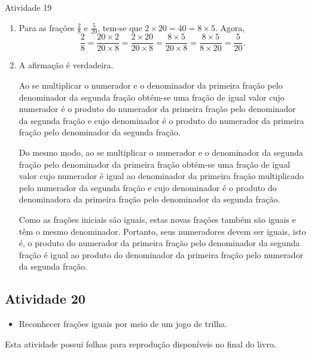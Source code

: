\documentclass[oneside]{book}
\begin{document}
\begin{multicols}{2}
\begin{resposta*}{Atividade 19}  
\begin{enumerate} [\quad a)] %
    \item       Para as frações       $\frac{2}{8}$       e       
$\frac{5}{20}$, tem-se que        $2 \times 20 = 40 = 8 \times 5$. Agora,       
$$\frac{2}{8} = \frac{20 \times 2}{20 \times 8} = \frac{2 \times 20}{20 \times 
8} = \frac{8 \times 5}{20 \times 8} = \frac{8 \times 5}{8 \times 20} = 
\frac{5}{20}.$$
    \item       A afirmação é verdadeira. 
  
  Ao se multiplicar o numerador e o denominador da primeira fração pelo 
denominador da segunda fração obtém-se uma fração de igual valor cujo numerador 
é o produto do numerador da primeira fração pelo denominador da segunda fração e 
cujo denominador é o produto do numerador da primeira fração pelo denominador da 
segunda fração.   
  
  Do mesmo modo, ao se multiplicar o numerador e o denominador da segunda fração 
pelo denominador da primeira fração obtém-se uma fração de igual valor cujo 
numerador é igual ao denominador da primeira fração multiplicado pelo numerador 
da segunda fração e cujo denominador é o produto do denominadora da primeira 
fração pelo denominador da segunda fração.   
  
  Como as frações iniciais são iguais, estas novas frações também são iguais e 
têm o mesmo denominador. Portanto, seus numeradores devem ser iguais, isto é, o 
produto do numerador da primeira fração pelo denominador da segunda fração é 
igual ao produto do denominador da primeira fração pelo numerador da segunda 
fração.  
\end{enumerate} %

  \end{resposta*}


\subsection{Atividade 20}

\begin{itemize} %
    \item       Reconhecer frações iguais por meio de um jogo de trilha.
\end{itemize} %
  
  
  Esta atividade possui     folhas para reprodução disponíveis no final do 
livro.
  

\end{multicols}
\end{document}
